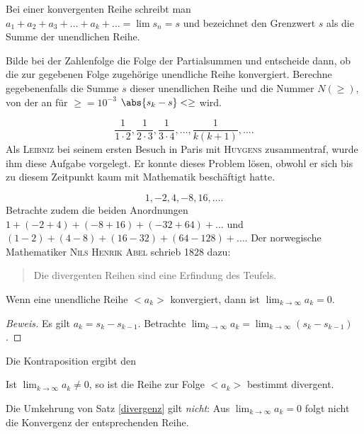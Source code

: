 \documentclass[%
11pt,%
twoside,%
titlepage,%
german,%
headsepline%
]{scrartcl}
\begin{document}
Bei einer konvergenten Reihe schreibt man $a_1+a_2+a_3+\dots+a_k+\dots = \lim s_n = s$
und bezeichnet den Grenzwert $s$ als die Summe der unendlichen Reihe.

\begin{ueb}
Bilde bei der Zahlenfolge die Folge der Partialsummen und entscheide dann, ob die zur gegebenen Folge zugeh\"orige unendliche Reihe konvergiert. Berechne gegebenenfalls die Summe $s$ dieser unendlichen Reihe und die Nummer $N(\ge)$, von der an f\"ur $\ge=10^{-3}$ $\abs{s_k-s}<\ge$ wird.
\begin{enumeratea}
\item $$\frac{1}{1\cdot2}, \frac{1}{2\cdot3}, \frac{1}{3\cdot4}, \dots, \frac{1}{k(k+1)}, \dots.$$
Als \textsc{Leibniz} bei seinem ersten Besuch in Paris mit \textsc{Huygens} zusammentraf, wurde ihm diese Aufgabe vorgelegt. Er konnte dieses Problem l\"osen, obwohl er sich bis zu diesem Zeitpunkt kaum mit Mathematik besch\"aftigt hatte.
\item $$1, -2, 4, -8, 16, \dots.$$
Betrachte zudem die beiden Anordnungen $1+(-2+4)+ (-8+16)+(-32+64)+\dots$ und $(1-2)+ (4-8)+(16-32)+ (64-128)+\dots$. Der norwegische Mathematiker \textsc{Nils Henrik Abel} schrieb 1828 dazu:
\begin{quote}
Die divergenten Reihen sind eine Erfindung des Teufels.
\end{quote}
\end{enumeratea}
\end{ueb}

\begin{csatz}{}
Wenn eine unendliche Reihe $<a_k>$ konvergiert, dann ist $\lim_{k\to\infty}a_k = 0$.
\end{csatz}
\begin{proof}[Beweis]
Es gilt $a_k=s_k-s_{k-1}$. Betrachte $\lim_{k\to\infty}a_k=\lim_{k\to\infty}(s_k-s_{k-1})$.
\end{proof}

Die Kontraposition ergibt den

\begin{csatz}{}\label{divergenz}
Ist $\lim_{k\to\infty}a_k\neq0$, so ist die Reihe zur Folge $<a_k>$ bestimmt divergent.
\end{csatz}

\begin{bem}
Die Umkehrung von Satz \ref{divergenz} gilt \emph{nicht}: Aus $\lim_{k\to\infty}a_k=0$ folgt nicht die Konvergenz der entsprechenden Reihe.
\end{bem}
\end{document}
